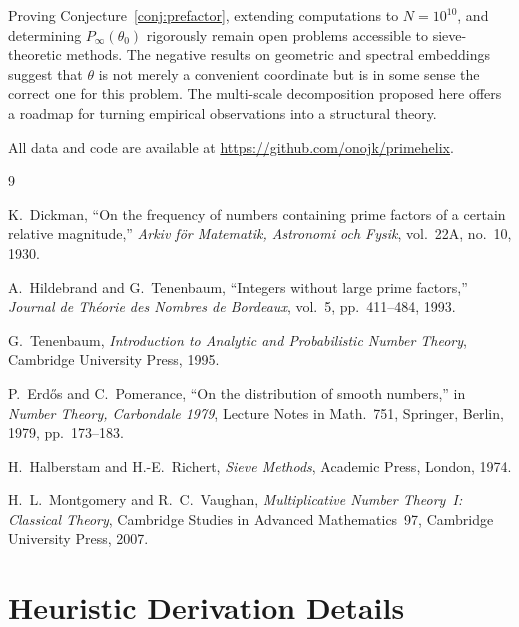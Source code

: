 \documentclass[11pt]{article}
\theoremstyle{definition}
\begin{document}
Proving Conjecture~\ref{conj:prefactor}, extending computations to \(N = 10^{10}\),
and determining \(P_\infty(\theta_0)\) rigorously remain open problems accessible to
sieve-theoretic methods.  The negative results on geometric and spectral embeddings
suggest that \(\theta\) is not merely a convenient coordinate but is in some sense
the correct one for this problem.  The multi-scale decomposition proposed here offers
a roadmap for turning empirical observations into a structural theory.

All data and code are available at \url{https://github.com/onojk/primehelix}.

\begin{thebibliography}{9}

K.~Dickman,
``On the frequency of numbers containing prime factors of a certain relative
  magnitude,''
\textit{Arkiv f\"{o}r Matematik, Astronomi och Fysik},
vol.~22A, no.~10, 1930.

A.~Hildebrand and G.~Tenenbaum,
``Integers without large prime factors,''
\textit{Journal de Th\'{e}orie des Nombres de Bordeaux},
vol.~5, pp.~411--484, 1993.

G.~Tenenbaum,
\textit{Introduction to Analytic and Probabilistic Number Theory},
Cambridge University Press, 1995.

P.~Erd\H{o}s and C.~Pomerance,
``On the distribution of smooth numbers,''
in \textit{Number Theory, Carbondale 1979}, Lecture Notes in Math.\ 751,
Springer, Berlin, 1979, pp.~173--183.

H.~Halberstam and H.-E.~Richert,
\textit{Sieve Methods},
Academic Press, London, 1974.

H.~L.~Montgomery and R.~C.~Vaughan,
\textit{Multiplicative Number Theory~I: Classical Theory},
Cambridge Studies in Advanced Mathematics~97,
Cambridge University Press, 2007.

\end{thebibliography}

\appendix

\section{Heuristic Derivation Details}
\label{app:heuristic-derivation}
\end{document}
